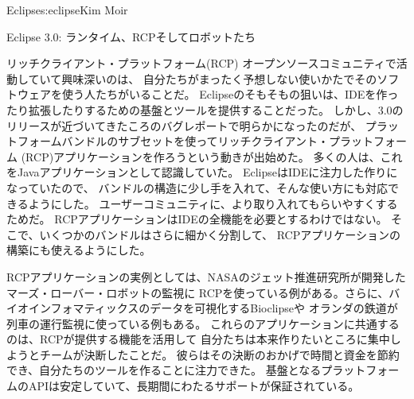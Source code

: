 \begin{aosachapter}{Eclipse}{s:eclipse}{Kim Moir}
\begin{aosasect1}{Eclipse 3.0: ランタイム、RCPそしてロボットたち}
\begin{aosasect2}{リッチクライアント・プラットフォーム(RCP)}
オープンソースコミュニティで活動していて興味深いのは、
自分たちがまったく予想しない使いかたでそのソフトウェアを使う人たちがいることだ。
Eclipseのそもそもの狙いは、IDEを作ったり拡張したりするための基盤とツールを提供することだった。
しかし、3.0のリリースが近づいてきたころのバグレポートで明らかになったのだが、
プラットフォームバンドルのサブセットを使ってリッチクライアント・プラットフォーム
(RCP)アプリケーションを作ろうという動きが出始めた。
多くの人は、これをJavaアプリケーションとして認識していた。
EclipseはIDEに注力した作りになっていたので、
バンドルの構造に少し手を入れて、そんな使い方にも対応できるようにした。
ユーザーコミュニティに、より取り入れてもらいやすくするためだ。
RCPアプリケーションはIDEの全機能を必要とするわけではない。
そこで、いくつかのバンドルはさらに細かく分割して、
RCPアプリケーションの構築にも使えるようにした。

RCPアプリケーションの実例としては、NASAのジェット推進研究所が開発したマーズ・ローバー・ロボットの監視に
RCPを使っている例がある。さらに、バイオインフォマティックスのデータを可視化するBioclipseや
オランダの鉄道が列車の運行監視に使っている例もある。
これらのアプリケーションに共通するのは、RCPが提供する機能を活用して
自分たちは本来作りたいところに集中しようとチームが決断したことだ。
彼らはその決断のおかげで時間と資金を節約でき、自分たちのツールを作ることに注力できた。
基盤となるプラットフォームのAPIは安定していて、長期間にわたるサポートが保証されている。


\end{aosasect2}
\end{aosasect1}
\end{aosachapter}
